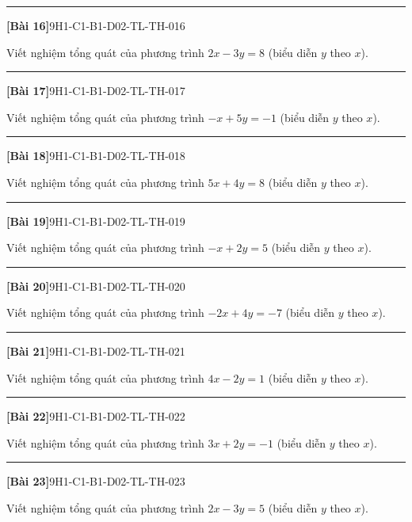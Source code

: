 \documentclass[12pt,a4paper]{article}
\newif\ifloigiai
\newenvironment{cauhoi}[2]{%
  \par\medskip\noindent\rule{\textwidth}{0.4pt}\par\nopagebreak
  \noindent\textbf{[#1]}\hfill{\scriptsize\ttfamily #2}\par\nopagebreak\smallskip}{\par}
\newcommand{\loigiai}[1]{\ifloigiai\par\smallskip\noindent\textit{Lời giải.} #1\par\fi}
\begin{document}
\begin{cauhoi}{Bài 16}{9H1-C1-B1-D02-TL-TH-016}
Viết nghiệm tổng quát của phương trình $2x-3y=8$ (biểu diễn $y$ theo $x$).
\loigiai{Ta có $-3y=8-2x$ nên $y=\dfrac{2}{3}x-\dfrac{8}{3}$. Nghiệm tổng quát là $(x;\,\dfrac{2}{3}x-\dfrac{8}{3})$ với $x\in\mathbb R$.}
\end{cauhoi}
\begin{cauhoi}{Bài 17}{9H1-C1-B1-D02-TL-TH-017}
Viết nghiệm tổng quát của phương trình $-x+5y=-1$ (biểu diễn $y$ theo $x$).
\loigiai{Ta có $5y=-1+x$ nên $y=\dfrac{1}{5}x-\dfrac{1}{5}$. Nghiệm tổng quát là $(x;\,\dfrac{1}{5}x-\dfrac{1}{5})$ với $x\in\mathbb R$.}
\end{cauhoi}
\begin{cauhoi}{Bài 18}{9H1-C1-B1-D02-TL-TH-018}
Viết nghiệm tổng quát của phương trình $5x+4y=8$ (biểu diễn $y$ theo $x$).
\loigiai{Ta có $4y=8-5x$ nên $y=-\dfrac{5}{4}x+2$. Nghiệm tổng quát là $(x;\,-\dfrac{5}{4}x+2)$ với $x\in\mathbb R$.}
\end{cauhoi}
\begin{cauhoi}{Bài 19}{9H1-C1-B1-D02-TL-TH-019}
Viết nghiệm tổng quát của phương trình $-x+2y=5$ (biểu diễn $y$ theo $x$).
\loigiai{Ta có $2y=5+x$ nên $y=\dfrac{1}{2}x+\dfrac{5}{2}$. Nghiệm tổng quát là $(x;\,\dfrac{1}{2}x+\dfrac{5}{2})$ với $x\in\mathbb R$.}
\end{cauhoi}
\begin{cauhoi}{Bài 20}{9H1-C1-B1-D02-TL-TH-020}
Viết nghiệm tổng quát của phương trình $-2x+4y=-7$ (biểu diễn $y$ theo $x$).
\loigiai{Ta có $4y=-7+2x$ nên $y=\dfrac{1}{2}x-\dfrac{7}{4}$. Nghiệm tổng quát là $(x;\,\dfrac{1}{2}x-\dfrac{7}{4})$ với $x\in\mathbb R$.}
\end{cauhoi}
\begin{cauhoi}{Bài 21}{9H1-C1-B1-D02-TL-TH-021}
Viết nghiệm tổng quát của phương trình $4x-2y=1$ (biểu diễn $y$ theo $x$).
\loigiai{Ta có $-2y=1-4x$ nên $y=2x-\dfrac{1}{2}$. Nghiệm tổng quát là $(x;\,2x-\dfrac{1}{2})$ với $x\in\mathbb R$.}
\end{cauhoi}
\begin{cauhoi}{Bài 22}{9H1-C1-B1-D02-TL-TH-022}
Viết nghiệm tổng quát của phương trình $3x+2y=-1$ (biểu diễn $y$ theo $x$).
\loigiai{Ta có $2y=-1-3x$ nên $y=-\dfrac{3}{2}x-\dfrac{1}{2}$. Nghiệm tổng quát là $(x;\,-\dfrac{3}{2}x-\dfrac{1}{2})$ với $x\in\mathbb R$.}
\end{cauhoi}
\begin{cauhoi}{Bài 23}{9H1-C1-B1-D02-TL-TH-023}
Viết nghiệm tổng quát của phương trình $2x-3y=5$ (biểu diễn $y$ theo $x$).
\loigiai{Ta có $-3y=5-2x$ nên $y=\dfrac{2}{3}x-\dfrac{5}{3}$. Nghiệm tổng quát là $(x;\,\dfrac{2}{3}x-\dfrac{5}{3})$ với $x\in\mathbb R$.}
\end{cauhoi}
\end{document}
